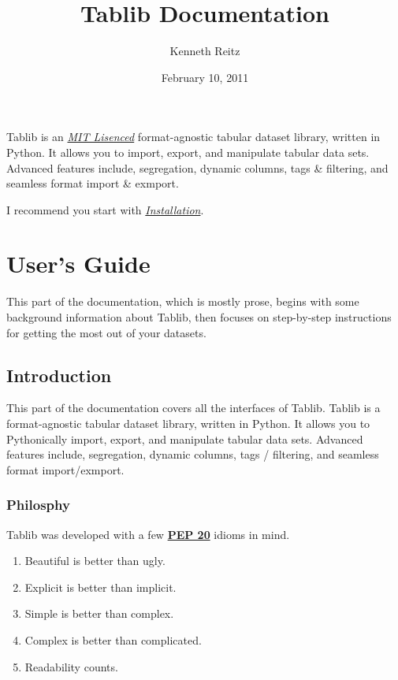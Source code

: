 \documentclass[a4paper,12pt,english]{sphinxmanual}
\title{Tablib Documentation}
\date{February 10, 2011}
\author{Kenneth Reitz}
\begin{document}
\maketitle
\tableofcontents
{}\label{index::doc}


Tablib is an {\hyperref[intro:mit]{\emph{MIT Lisenced}}} format-agnostic tabular dataset library, written in Python. It allows you to import, export, and manipulate tabular data sets. Advanced features include, segregation, dynamic columns, tags \& filtering, and seamless format import \& exmport.

I recommend you start with {\hyperref[install:install]{\emph{Installation}}}.


\part{User's Guide}
\label{index:user-s-guide}\label{index:tablib-pythonic-tabular-data}
This part of the documentation, which is mostly prose, begins with some background information about Tablib, then focuses on step-by-step instructions for getting the most out of your datasets.


\chapter{Introduction}
\label{intro:introduction}\label{intro:intro}\label{intro::doc}
This part of the documentation covers all the interfaces of Tablib.
Tablib is a format-agnostic tabular dataset library, written in Python. It allows you to Pythonically import, export, and manipulate tabular data sets. Advanced features include, segregation, dynamic columns, tags / filtering, and seamless format import/exmport.


\section{Philosphy}
\label{intro:philosphy}
Tablib was developed with a few \href{http://www.python.org/dev/peps/pep-0020}{\textbf{PEP 20}} idioms in mind.
\begin{enumerate}
\item {} 
Beautiful is better than ugly.

\item {} 
Explicit is better than implicit.

\item {} 
Simple is better than complex.

\item {} 
Complex is better than complicated.

\item {} 
Readability counts.

\end{enumerate}
\end{document}

